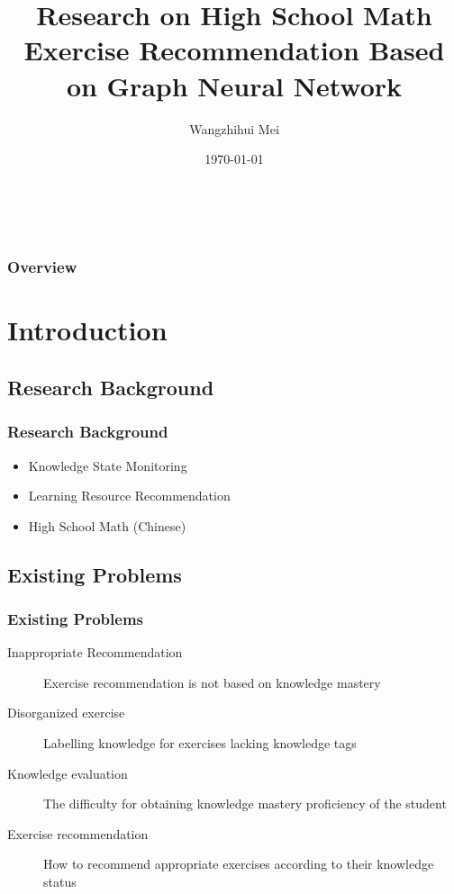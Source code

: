 \documentclass{beamer}
\title[Exercise Recommendation]{Research on High School Math Exercise Recommendation Based on Graph Neural Network} %
\author{Wangzhihui Mei} %
\institute[UOW] 
{
University of Wollongong \\ %
\medskip
\textit{maywzh@gmail.com} %
}
\date{\today} %
\begin{document}
\begin{frame}
  \titlepage\ %
\end{frame}

\begin{frame}
  \frametitle{Overview} %
  \tableofcontents %
\end{frame}


\section{Introduction}
\subsection{Research Background}
\begin{frame}
  \frametitle{Research Background}
  \begin{itemize}
    \item Knowledge State Monitoring
    \item Learning Resource Recommendation
    \item High School Math (Chinese)
  \end{itemize}
\end{frame}

\subsection{Existing Problems}
\begin{frame}
  \frametitle{Existing Problems}
  \begin{description}
    \item[Inappropriate Recommendation] Exercise recommendation is not based on knowledge mastery
    \item[Disorganized exercise] Labelling knowledge for exercises lacking knowledge tags
    \item[Knowledge evaluation] The difficulty for obtaining knowledge mastery proficiency of the student
    \item[Exercise recommendation] How to recommend appropriate exercises according to their knowledge status
  \end{description}
\end{frame}
\end{document}
